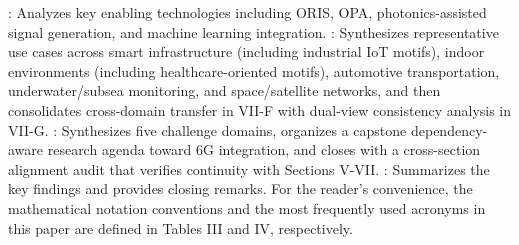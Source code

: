 \markdownRendererUlItem {}: Analyzes key enabling technologies including ORIS, OPA, photonics-assisted signal generation, and machine learning integration.\markdownRendererUlItemEnd 
\markdownRendererUlItem {}: Synthesizes representative use cases across smart infrastructure (including industrial IoT motifs), indoor environments (including healthcare-oriented motifs), automotive transportation, underwater/subsea monitoring, and space/satellite networks, and then consolidates cross-domain transfer in VII-F with dual-view consistency analysis in VII-G.\markdownRendererUlItemEnd 
\markdownRendererUlItem {}: Synthesizes five challenge domains, organizes a capstone dependency-aware research agenda toward 6G integration, and closes with a cross-section alignment audit that verifies continuity with Sections V-VII.\markdownRendererUlItemEnd 
\markdownRendererUlItem {}: Summarizes the key findings and provides closing remarks.\markdownRendererUlItemEnd 
\markdownRendererUlEnd \markdownRendererInterblockSeparator
{}
\markdownRendererSectionEnd \markdownRendererSectionBegin
{}\markdownRendererInterblockSeparator
{}For the reader's convenience, the mathematical notation conventions and the most frequently used acronyms in this paper are defined in Tables III and IV, respectively.\markdownRendererParagraphSeparator
{}\markdownRendererInterblockSeparator
{}\markdownRendererInterblockSeparator
{}\markdownRendererInterblockSeparator
